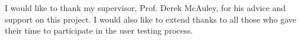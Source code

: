 
\begin{acknowledgements}

I would like to thank my supervisor, Prof. Derek McAuley, for his advice and support on this project. I would also like to extend thanks to all those who gave their time to participate in the user testing process.

\end{acknowledgements}
